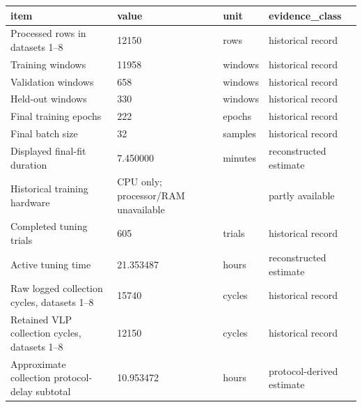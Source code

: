 \begin{tabular}{llll}
\toprule
item & value & unit & evidence\_class \\
\midrule
Processed rows in datasets 1--8 & 12150 & rows & historical record \\
Training windows & 11958 & windows & historical record \\
Validation windows & 658 & windows & historical record \\
Held-out windows & 330 & windows & historical record \\
Final training epochs & 222 & epochs & historical record \\
Final batch size & 32 & samples & historical record \\
Displayed final-fit duration & 7.450000 & minutes & reconstructed estimate \\
Historical training hardware & CPU only; processor/RAM unavailable &  & partly available \\
Completed tuning trials & 605 & trials & historical record \\
Active tuning time & 21.353487 & hours & reconstructed estimate \\
Raw logged collection cycles, datasets 1--8 & 15740 & cycles & historical record \\
Retained VLP collection cycles, datasets 1--8 & 12150 & cycles & historical record \\
Approximate collection protocol-delay subtotal & 10.953472 & hours & protocol-derived estimate \\
\bottomrule
\end{tabular}
